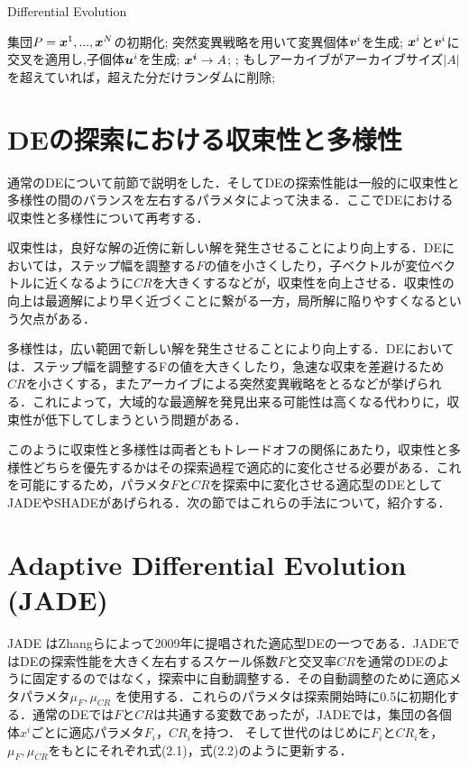 \documentclass[a4paper,11pt,oneside,openany]{jsbook}
\def\vector#1{\mbox{\boldmath $#1$}}
\begin{document}
\newpage
\begin{algorithm}
\caption{Differential Evolution}
\label{alg:pbnf}
\begin{algorithmic}
\STATE 集団$P={\vector{x}^1,...,\vector{x}^N}$の初期化;
        \STATE 突然変異戦略を用いて変異個体{$\vector{v}^i$}を生成;
        \STATE $\vector{x}^i$と$\vector{v}^i$に交叉を適用し,子個体$\vector{u}^i$を生成;
    \ENDFOR
        \IF {$f(\vector{u}^i) \leqq f(\vector{x}^i)$}
            \STATE $\vector{x^i} \rightarrow {A}$;
            \STATE {$\vector{x}^i :=\vector{u}^i$};
        \ENDIF
    \ENDFOR
    \STATE もしアーカイブがアーカイブサイズ$|A|$を超えていれば，超えた分だけランダムに削除;
\ENDWHILE
\end{algorithmic}
\end{algorithm}
\newpage

\section{DEの探索における収束性と多様性}
通常のDEについて前節で説明をした．そしてDEの探索性能は一般的に収束性と多様性の間のバランスを左右するパラメタによって決まる．ここでDEにおける収束性と多様性について再考する．

収束性は，良好な解の近傍に新しい解を発生させることにより向上する．DEにおいては，ステップ幅を調整する$F$の値を小さくしたり，子ベクトルが変位ベクトルに近くなるように$CR$を大きくするなどが，収束性を向上させる．収束性の向上は最適解により早く近づくことに繋がる一方，局所解に陥りやすくなるという欠点がある．

多様性は，広い範囲で新しい解を発生させることにより向上する．DEにおいては．ステップ幅を調整するFの値を大きくしたり，急速な収束を差避けるため$CR$を小さくする，またアーカイブによる突然変異戦略をとるなどが挙げられる．これによって，大域的な最適解を発見出来る可能性は高くなる代わりに，収束性が低下してしまうという問題がある．

このように収束性と多様性は両者ともトレードオフの関係にあたり，収束性と多様性どちらを優先するかはその探索過程で適応的に変化させる必要がある．これを可能にするため，パラメタ$F$と$CR$を探索中に変化させる適応型のDEとしてJADEやSHADEがあげられる．次の節ではこれらの手法について，紹介する．

\section{Adaptive Differential Evolution (JADE)}
JADE \cite{JADE} はZhangらによって2009年に提唱された適応型DEの一つである．JADEではDEの探索性能を大きく左右するスケール係数$F$と交叉率$CR$を通常のDEのように固定するのではなく，探索中に自動調整する．その自動調整のために適応メタパラメタ$\mu _F,\mu _{CR}$ を使用する．これらのパラメタは探索開始時に0.5に初期化する．通常のDEでは$F$と$CR$は共通する変数であったが，JADEでは，集団の各個体\vector{x^i}ごとに適応パラメタ$F_i$，$CR_i$を持つ．
そして世代のはじめに$F_i$と$CR_i$を，$\mu _F,\mu _{CR}$をもとにそれぞれ式(2.1)，式(2.2)のように更新する．
\end{document}
